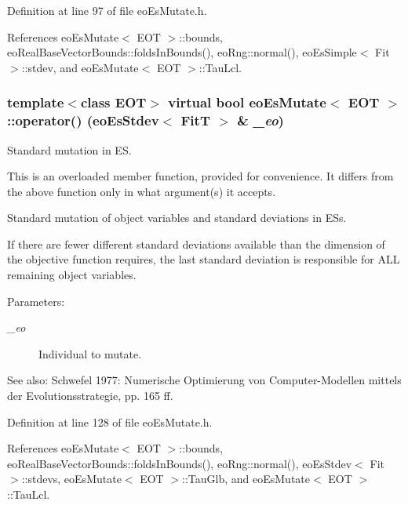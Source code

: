Definition at line 97 of file eo\-Es\-Mutate.h.

References eo\-Es\-Mutate$<$ EOT $>$::bounds, eo\-Real\-Base\-Vector\-Bounds::folds\-In\-Bounds(), eo\-Rng::normal(), eo\-Es\-Simple$<$ Fit $>$::stdev, and eo\-Es\-Mutate$<$ EOT $>$::Tau\-Lcl.
\subsubsection{\setlength{\rightskip}{0pt plus 5cm}template$<$class EOT$>$ virtual bool {\bf eo\-Es\-Mutate}$<$ {\bf EOT} $>$::operator() ({\bf eo\-Es\-Stdev}$<$ {\bf Fit\-T} $>$ \& {\em \_\-eo})\hspace{0.3cm}{\tt  [inline, virtual]}}\label{classeo_es_mutate_a4}


Standard mutation in ES. 

This is an overloaded member function, provided for convenience. It differs from the above function only in what argument(s) it accepts.

Standard mutation of object variables and standard deviations in ESs.

If there are fewer different standard deviations available than the dimension of the objective function requires, the last standard deviation is responsible for ALL remaining object variables.

\begin{Desc}
\item[Parameters:]
\begin{description}
\item[{\em \_\-eo}]Individual to mutate.\end{description}
\end{Desc}
\begin{Desc}
\item[See also:]Schwefel 1977: Numerische Optimierung von Computer-Modellen mittels der Evolutionsstrategie, pp. 165 ff. \end{Desc}


Definition at line 128 of file eo\-Es\-Mutate.h.

References eo\-Es\-Mutate$<$ EOT $>$::bounds, eo\-Real\-Base\-Vector\-Bounds::folds\-In\-Bounds(), eo\-Rng::normal(), eo\-Es\-Stdev$<$ Fit $>$::stdevs, eo\-Es\-Mutate$<$ EOT $>$::Tau\-Glb, and eo\-Es\-Mutate$<$ EOT $>$::Tau\-Lcl.
